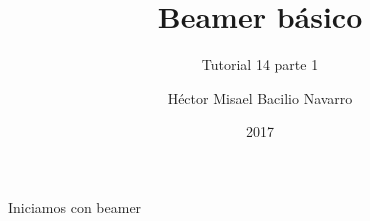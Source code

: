 \documentclass{beamer}
\title[Beamer]{Beamer básico}
\subtitle{Tutorial 14 parte 1}
\author[Héctor Misael Bacilio Navarro]{Héctor Misael Bacilio Navarro}
\institute[]{Universidad de Guadalajara}
\date[2017]{\scriptsize{2017}}
\begin{document}
\begin{frame}
\titlepage
\end{frame}

\begin{frame}
Iniciamos con beamer
\end{frame}
\end{document}
